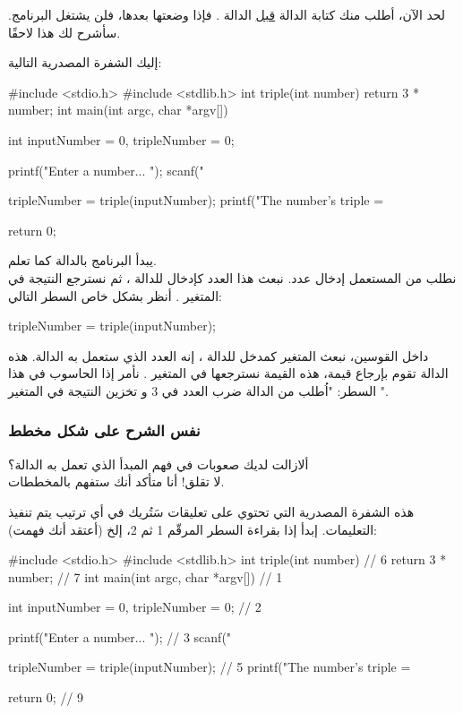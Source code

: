 لحد الآن، أطلب منك كتابة الدالة 
\underline{قبل}
الدالة 
.
فإذا وضعتها بعدها، فلن يشتغل البرنامج. سأشرح لك هذا لاحقًا.

إليك الشفرة المصدرية التالية:

\begin{Csource}
#include <stdio.h>
#include <stdlib.h>
int triple(int number)
{
	return 3 * number;
}   
int main(int argc, char *argv[])
{
	int inputNumber = 0, tripleNumber = 0;
	
	printf("Enter a number... ");
	scanf("%
	
	tripleNumber = triple(inputNumber);
	printf("The number's triple = %
	
	return 0;
}
\end{Csource}

يبدأ البرنامج بالدالة 
كما تعلم.\\
نطلب من المستعمل إدخال عدد. نبعث هذا العدد كإدخال للدالة 
،
ثم نسترجع النتيجة في المتغير 
.
أنظر بشكل خاص السطر التالي:

\begin{Csource}
tripleNumber = triple(inputNumber);
\end{Csource}

داخل القوسين، نبعث المتغير كمدخل للدالة 
،
إنه العدد الذي ستعمل به الدالة. هذه الدالة تقوم بإرجاع قيمة، هذه القيمة نسترجعها في المتغير 
.
نأمر إذا الحاسوب في هذا السطر: "اُطلب من الدالة 
ضرب العدد
في 3 و تخزين النتيجة في المتغير 
".

\subsubsection{نفس الشرح على شكل مخطط}

ألازالت لديك صعوبات في فهم المبدأ الذي تعمل به الدالة؟\\
لا تقلق! أنا متأكد أنك ستفهم بالمخططات.

هذه الشفرة المصدرية التي تحتوي على تعليقات سَتُريك في أي ترتيب يتم تنفيذ التعليمات. إبدأ إذا بقراءة السطر المرقّم 1 ثم 2، إلخ (أعتقد أنك فهمت):

\begin{Csource}
#include <stdio.h>
#include <stdlib.h>
int triple(int number) // 6
{
	return 3 * number; // 7
}   
int main(int argc, char *argv[]) // 1
{
	int inputNumber = 0, tripleNumber = 0; // 2
	
	printf("Enter a number... "); // 3
	scanf("%
	
	tripleNumber = triple(inputNumber); // 5
	printf("The number's triple = %
	
	return 0; // 9
}
\end{Csource}

